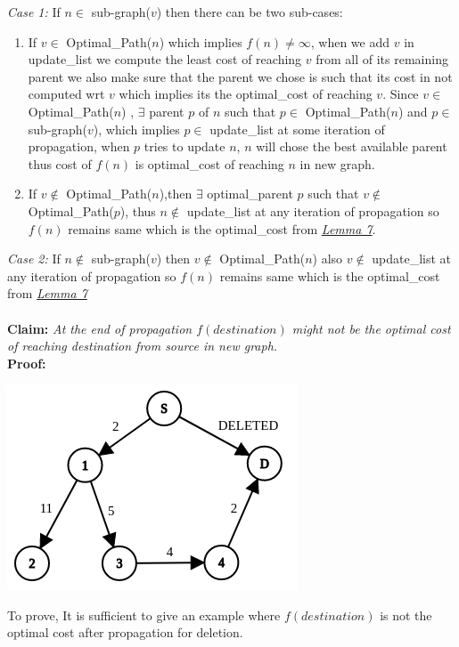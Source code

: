 \documentclass[a4paper]{article}
\begin{document}
\textit{Case 1:} If $n \in$ sub-graph($v$) then there can be two sub-cases: \begin{enumerate}
\item If $v \in$ Optimal\_Path($n$) which implies $f(n) \neq \infty$, when we add $v$ in update\_list we compute the least cost of reaching $v$ from all of its remaining parent we also make sure that the parent we chose is such that its cost in not computed wrt $v$ which implies its the optimal\_cost of reaching $v$. Since $v \in$ Optimal\_Path($n$) , $\exists$ parent $p$ of $n$ such that $p \in$ Optimal\_Path($n$) and $p \in$ sub-graph($v$), which implies $p \in$ update\_list at some iteration of propagation, when $p$ tries to update $n$, $n$ will chose the best available parent thus cost of $f(n)$ is optimal\_cost of reaching $n$ in new graph.
\item If $v \notin$ Optimal\_Path($n$),then $\exists$ optimal\_parent $p$ such that $v \notin $ Optimal\_Path($p$), thus $n \notin$ update\_list at any iteration of propagation so $f(n)$ remains same which is the optimal\_cost from \hyperlink{Lemma 7}{\textit{Lemma 7}}. 
\end{enumerate}
\textit{Case 2:} If $n \notin$ sub-graph($v$) then $v \notin$ Optimal\_Path($n$) also $v \notin$ update\_list at any iteration of propagation so $f(n)$ remains same which is the optimal\_cost from \hyperlink{Lemma 7}{\textit{Lemma 7}}\\
\\
\textbf{Claim:} \textit{At the end of propagation $f(destination)$ might not be the optimal cost of reaching destination from source in new graph. }\\
\textbf{Proof:}
\begin{center}
    \includegraphics[scale=0.4]{img/del_prop.png}
\end{center}
To prove, It is sufficient to give an example where $f(destination)$ is not the optimal cost after propagation for deletion.\\
\end{document}

